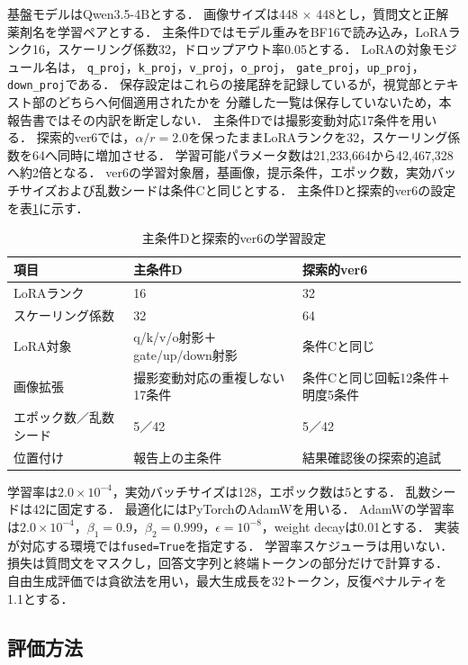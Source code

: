 \documentclass[uplatex,dvipdfmx]{jsarticle}
\begin{document}
基盤モデルはQwen3.5-4Bとする．
画像サイズは448 $\times$ 448とし，質問文と正解薬剤名を学習ペアとする．
主条件Dではモデル重みをBF16で読み込み，LoRAランク16，スケーリング係数32，ドロップアウト率0.05とする．
LoRAの対象モジュール名は，
\texttt{q\_proj}，\texttt{k\_proj}，\texttt{v\_proj}，\texttt{o\_proj}，
\texttt{gate\_proj}，\texttt{up\_proj}，\texttt{down\_proj}である．
保存設定はこれらの接尾辞を記録しているが，視覚部とテキスト部のどちらへ何個適用されたかを
分離した一覧は保存していないため，本報告書ではその内訳を断定しない．
主条件Dでは撮影変動対応17条件を用いる．
探索的ver6では，$\alpha/r=2.0$を保ったままLoRAランクを32，スケーリング係数を64へ同時に増加させる．
学習可能パラメータ数は21,233,664から42,467,328へ約2倍となる．
ver6の学習対象層，基画像，提示条件，エポック数，実効バッチサイズおよび乱数シードは条件Cと同じとする．
主条件Dと探索的ver6の設定を表\ref{tab:primary_exploratory_settings}に示す．

\begin{table}[H]
  \centering
  \caption{主条件Dと探索的ver6の学習設定}
  \label{tab:primary_exploratory_settings}
  \small
  \begin{tabular}{|p{4.0cm}|p{4.2cm}|p{4.2cm}|}
    \hline
    項目 & 主条件D & 探索的ver6 \\ \hline
    LoRAランク & 16 & 32 \\ \hline
    スケーリング係数 & 32 & 64 \\ \hline
    LoRA対象 & q/k/v/o射影＋gate/up/down射影 & 条件Cと同じ \\ \hline
    画像拡張 & 撮影変動対応の重複しない17条件 & 条件Cと同じ回転12条件＋明度5条件 \\ \hline
    エポック数／乱数シード & 5／42 & 5／42 \\ \hline
    位置付け & 報告上の主条件 & 結果確認後の探索的追試 \\ \hline
  \end{tabular}
\end{table}

学習率は$2.0 \times 10^{-4}$，実効バッチサイズは128，エポック数は5とする．
乱数シードは42に固定する．
最適化にはPyTorchのAdamWを用いる．
AdamWの学習率は$2.0\times10^{-4}$，$\beta_1=0.9$，$\beta_2=0.999$，$\epsilon=10^{-8}$，weight decayは0.01とする．
実装が対応する環境では\texttt{fused=True}を指定する．
学習率スケジューラは用いない．
損失は質問文をマスクし，回答文字列と終端トークンの部分だけで計算する．
自由生成評価では貪欲法を用い，最大生成長を32トークン，反復ペナルティを1.1とする．

\subsection{評価方法}
\end{document}
